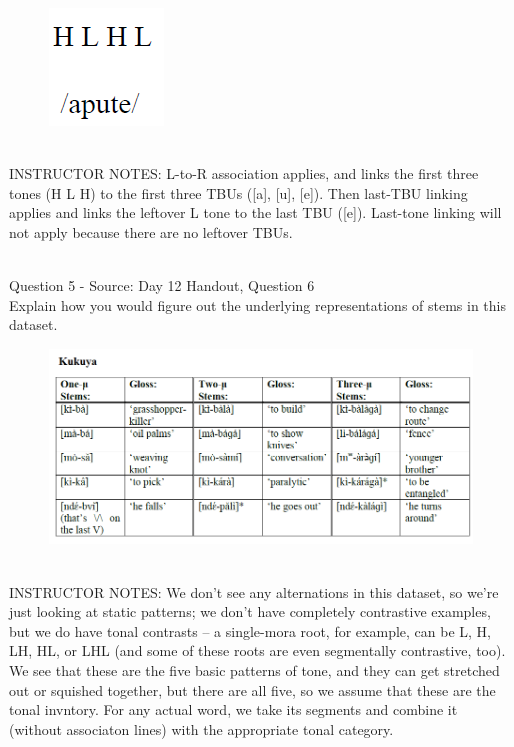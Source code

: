 \documentclass[12pt]{article}
\begin{document}
\begin{figure}[H]
\includegraphics{../images/mendetone_d.png}
\end{figure}

~\\
INSTRUCTOR NOTES: L-to-R association applies, and links the first three tones (H L H) to the first three TBUs ([a], [u], [e]). Then last-TBU linking applies and links the leftover L tone to the last TBU ([e]). Last-tone linking will not apply because there are no leftover TBUs.


~\\

{\large Question 5} - Source: Day 12 Handout, Question 6\\

Explain how you would figure out the underlying representations of stems in this dataset.\\

\begin{figure}[H]
\includegraphics{../images/kukuya.png}
\end{figure}

~\\
INSTRUCTOR NOTES: We don't see any alternations in this dataset, so we're just looking at static patterns; we don't have completely contrastive examples, but we do have tonal contrasts -- a single-mora root, for example, can be L, H, LH, HL, or LHL (and some of these roots are even segmentally contrastive, too). We see that these are the five basic patterns of tone, and they can get stretched out or squished together, but there are all five, so we assume that these are the tonal invntory. For any actual word, we take its segments and combine it (without associaton lines) with the appropriate tonal category.
\end{document}
